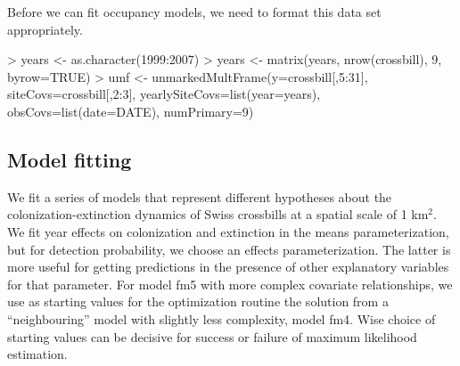 \documentclass[12pt]{article}
\renewenvironment{Schunk}{\vspace{\topsep}}{\vspace{\topsep}}
\begin{document}
Before we can fit occupancy models, we need to format this data set
appropriately.


\begin{small}

\begin{Schunk}
\begin{Sinput}
> years <- as.character(1999:2007)
> years <- matrix(years, nrow(crossbill), 9, byrow=TRUE)
> umf <- unmarkedMultFrame(y=crossbill[,5:31],
     siteCovs=crossbill[,2:3], yearlySiteCovs=list(year=years),
     obsCovs=list(date=DATE),
     numPrimary=9)
\end{Sinput}
\end{Schunk}
\end{small}



\subsection{Model fitting}
We fit a series of models that represent different hypotheses about
the colonization-extinction dynamics of Swiss crossbills
at a spatial scale of 1 km$^2$.
We fit year effects on colonization and extinction in the means
parameterization,
but for detection probability, we choose an effects parameterization.
The latter is more useful for getting predictions in the presence of
other explanatory variables for that parameter.
For model fm5 with more complex covariate relationships, we use as
starting values for the optimization routine
the solution from a ``neighbouring'' model with slightly less
complexity, model fm4.
Wise choice of starting values can be decisive for success or failure
of maximum likelihood estimation.
\end{document}
